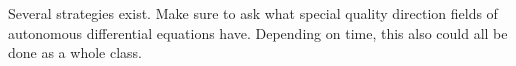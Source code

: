 \documentclass[handout]{ximera}
\begin{document}
\begin{instructorNotes}
Several strategies exist.  
Make sure to ask what special quality direction fields of autonomous differential equations have.  
Depending on time, this also could all be done as a whole class.
\end{instructorNotes}





%
%	
%	
%	
%	
%	
%	
\end{document}
